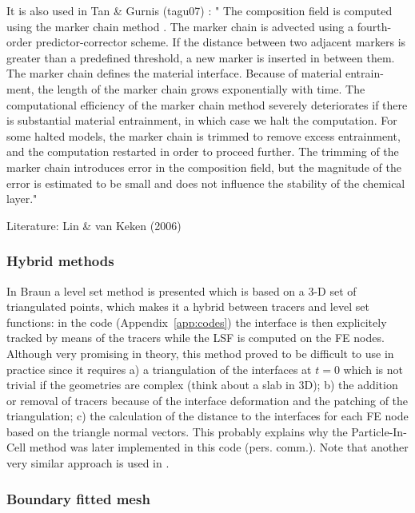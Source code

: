 It is also used in Tan \& Gurnis (tagu07) \cite{tagu07}: "
The composition field is computed using the marker
chain method \cite{dagu86,vaks97}. The marker chain is advected using a fourth-order
predictor-corrector scheme. If the distance between two
adjacent markers is greater than a predefined threshold, a
new marker is inserted in between them. The marker chain
defines the material interface. Because of material entrain-
ment, the length of the marker chain grows exponentially
with time. The computational efficiency of the marker chain
method severely deteriorates if there is substantial material
entrainment, in which case we halt the computation. For
some halted models, the marker chain is trimmed to remove
excess entrainment, and the computation restarted in order
to proceed further. The trimming of the marker chain
introduces error in the composition field, but the magnitude
of the error is estimated to be small and does not influence
the stability of the chemical layer."

Literature: Lin \& van Keken (2006) \cite{liva05,liva06a,liva06b,kaus05,mulyukova}

\subsubsection{Hybrid methods}

In Braun \etal \cite{brtf08} a level set method is presented which is based on a 3-D set
of triangulated points, which makes it a hybrid between tracers and level set functions:
in the \douar code (Appendix~\ref{app:codes}) the interface is then explicitely tracked by means of the tracers while the LSF is computed 
on the FE nodes. Although very promising in theory, this method proved to be difficult to use in practice
since it requires a) a triangulation of the interfaces at $t=0$ which is not trivial if the geometries
are complex (think about a slab in 3D); b) the addition or removal of tracers because of the interface deformation
and the patching of the triangulation; c) the calculation of the distance to the interfaces for each 
FE node based on the triangle normal vectors. 
This probably explains why the Particle-In-Cell method was later implemented in this code (pers. comm.).
Note that another very similar approach is used in \cite{saev10}.



\subsubsection{Boundary fitted mesh}

